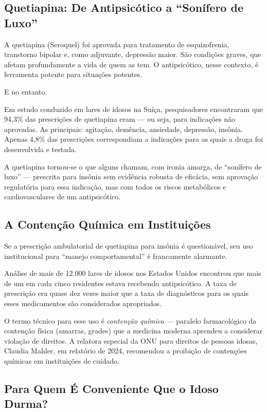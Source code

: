 \subsection{Quetiapina: De Antipsicótico a \enquote{Sonífero de Luxo}}

A quetiapina (Seroquel) foi aprovada para tratamento de esquizofrenia, transtorno bipolar e, como adjuvante, depressão maior. São condições graves, que afetam profundamente a vida de quem as tem. O antipsicótico, nesse contexto, é ferramenta potente para situações potentes.

E no entanto.

Em estudo conduzido em lares de idosos na Suíça, pesquisadores encontraram que 94,3\% das prescrições de quetiapina eram  --- ou seja, para indicações não aprovadas. As principais: agitação, demência, ansiedade, depressão, insônia. Apenas 4,8\% das prescrições correspondiam a indicações para as quais a droga foi desenvolvida e testada.

A quetiapina tornou-se o que alguns chamam, com ironia amarga, de \enquote{sonífero de luxo} --- prescrita para insônia sem evidência robusta de eficácia, sem aprovação regulatória para essa indicação, mas com todos os riscos metabólicos e cardiovasculares de um antipsicótico.

\subsection{A Contenção Química em Instituições}

Se a prescrição ambulatorial de quetiapina para insônia é questionável, seu uso institucional para \enquote{manejo comportamental} é francamente alarmante.

Análise de mais de 12.000 lares de idosos nos Estados Unidos encontrou que mais de um em cada cinco residentes estava recebendo antipsicótico. A taxa de prescrição era quase dez vezes maior que a taxa de diagnósticos para os quais esses medicamentos são considerados apropriados.

O termo técnico para esse uso é \textit{contenção química} --- paralelo farmacológico da contenção física (amarras, grades) que a medicina moderna aprendeu a considerar violação de direitos. A relatora especial da ONU para direitos de pessoas idosas, Claudia Mahler, em relatório de 2024, recomendou a proibição de contenções químicas em instituições de cuidado.

\subsection{Para Quem É Conveniente Que o Idoso Durma?}

